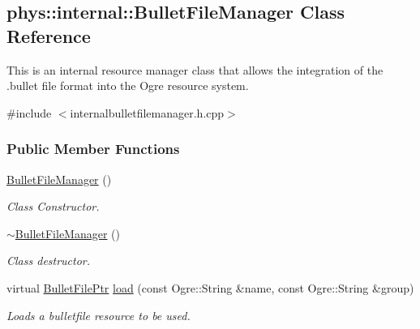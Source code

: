 \hypertarget{classphys_1_1internal_1_1BulletFileManager}{
\subsection{phys::internal::BulletFileManager Class Reference}
\label{classphys_1_1internal_1_1BulletFileManager}
}


This is an internal resource manager class that allows the integration of the .bullet file format into the Ogre resource system.  




{\ttfamily \#include $<$internalbulletfilemanager.h.cpp$>$}

\subsubsection*{Public Member Functions}
\begin{DoxyCompactItemize}
\item 
\hypertarget{classphys_1_1internal_1_1BulletFileManager_a93e2849b098764ef30b2933da5da9696}{
\hyperlink{classphys_1_1internal_1_1BulletFileManager_a93e2849b098764ef30b2933da5da9696}{BulletFileManager} ()}
\label{classphys_1_1internal_1_1BulletFileManager_a93e2849b098764ef30b2933da5da9696}

\begin{DoxyCompactList}\small\item\em Class Constructor. \item\end{DoxyCompactList}\item 
\hypertarget{classphys_1_1internal_1_1BulletFileManager_a1554959d6fcbc1cbb23c7f09bffef023}{
\hyperlink{classphys_1_1internal_1_1BulletFileManager_a1554959d6fcbc1cbb23c7f09bffef023}{$\sim$BulletFileManager} ()}
\label{classphys_1_1internal_1_1BulletFileManager_a1554959d6fcbc1cbb23c7f09bffef023}

\begin{DoxyCompactList}\small\item\em Class destructor. \item\end{DoxyCompactList}\item 
virtual \hyperlink{classphys_1_1internal_1_1BulletFilePtr}{BulletFilePtr} \hyperlink{classphys_1_1internal_1_1BulletFileManager_a7c2dff7475d112bd525c29882f731603}{load} (const Ogre::String \&name, const Ogre::String \&group)
\begin{DoxyCompactList}\small\item\em Loads a bulletfile resource to be used. \item\end{DoxyCompactList}\end{DoxyCompactItemize}

